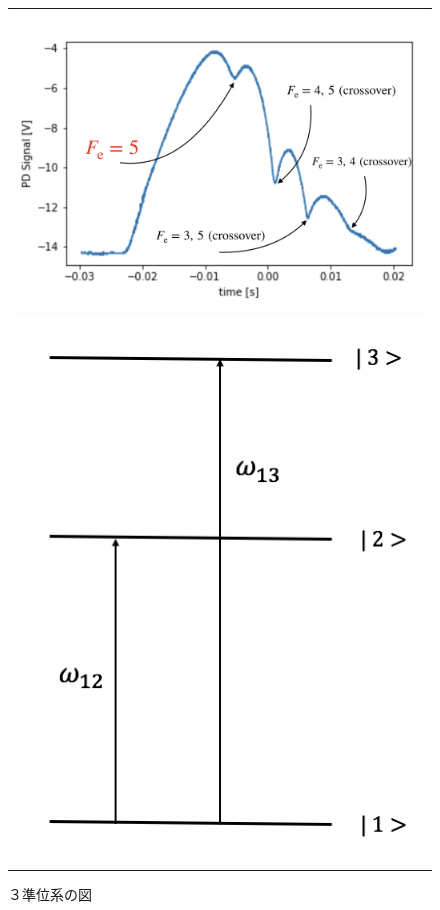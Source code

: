 \documentclass[uplatex, dvipdfmx, a4paper, report, papersize, 11pt]{jsbook}
\begin{document}
\begin{figure}[H]
\begin{tabular}{c}
      \begin{minipage}{1\hsize}
        \centering
          \includegraphics[keepaspectratio,  scale=0.5,  angle=0]
                          {figures/chapter2/PD_Signal_main.png}
                          \caption{飽和吸収分光によって観測されたCsの超微細構造}
                          \label{PD_Signal_main}
      \end{minipage} \\
      \begin{minipage}{0.50\hsize}
        \centering
          \includegraphics[keepaspectratio,  scale=0.3,  angle=0]
                          {figures/chapter2/crossover-diagram.png}
                          \caption{３準位系の図}
                          \label{crossover-diagram}
      \end{minipage}
    \end{tabular}
\end{figure}
\end{document}
